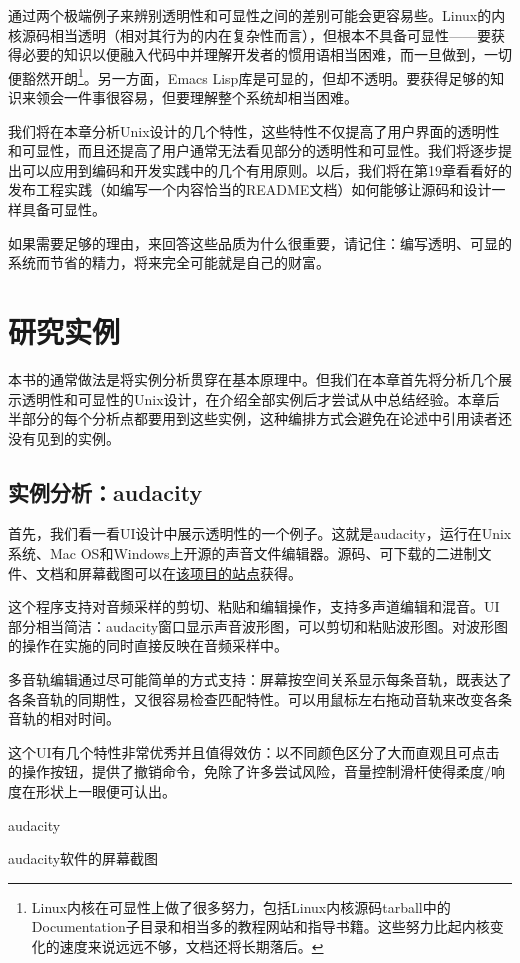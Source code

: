 \documentclass[12pt,oneside]{ctexbook}
\begin{document}
\begin{common-format}
通过两个极端例子来辨别透明性和可显性之间的差别可能会更容易些。Linux的内核源码相当透明（相对其行为的内在复杂性而言），但根本不具备可显性——要获得必要的知识以便融入代码中并理解开发者的惯用语相当困难，而一旦做到，一切便豁然开朗\footnote{Linux内核在可显性上做了很多努力，包括Linux内核源码tarball中的Documentation子目录和相当多的教程网站和指导书籍。这些努力比起内核变化的速度来说远远不够，文档还将长期落后。}。另一方面，Emacs Lisp库是可显的，但却不透明。要获得足够的知识来领会一件事很容易，但要理解整个系统却相当困难。

我们将在本章分析Unix设计的几个特性，这些特性不仅提高了用户界面的透明性和可显性，而且还提高了用户通常无法看见部分的透明性和可显性。我们将逐步提出可以应用到编码和开发实践中的几个有用原则。以后，我们将在第19章看看好的发布工程实践（如编写一个内容恰当的README文档）如何能够让源码和设计一样具备可显性。

如果需要足够的理由，来回答这些品质为什么很重要，请记住：编写透明、可显的系统而节省的精力，将来完全可能就是自己的财富。


\section{研究实例}
本书的通常做法是将实例分析贯穿在基本原理中。但我们在本章首先将分析几个展示透明性和可显性的Unix设计，在介绍全部实例后才尝试从中总结经验。本章后半部分的每个分析点都要用到这些实例，这种编排方式会避免在论述中引用读者还没有见到的实例。

\subsection{实例分析：audacity}
首先，我们看一看UI设计中展示透明性的一个例子。这就是audacity，运行在Unix系统、Mac OS和Windows上开源的声音文件编辑器。源码、可下载的二进制文件、文档和屏幕截图可以在\href{http://audacity.sourceforge.net/}{该项目的站点}获得。

这个程序支持对音频采样的剪切、粘贴和编辑操作，支持多声道编辑和混音。UI部分相当简洁：audacity窗口显示声音波形图，可以剪切和粘贴波形图。对波形图的操作在实施的同时直接反映在音频采样中。

多音轨编辑通过尽可能简单的方式支持：屏幕按空间关系显示每条音轨，既表达了各条音轨的同期性，又很容易检查匹配特性。可以用鼠标左右拖动音轨来改变各条音轨的相对时间。

这个UI有几个特性非常优秀并且值得效仿：以不同颜色区分了大而直观且可点击的操作按钮，提供了撤销命令，免除了许多尝试风险，音量控制滑杆使得柔度/响度在形状上一眼便可认出。
\begin{linefig}{audacity}
\caption{audacity软件的屏幕截图}
\label{fig:audacity}
\end{linefig}


\end{common-format}
\end{document}
